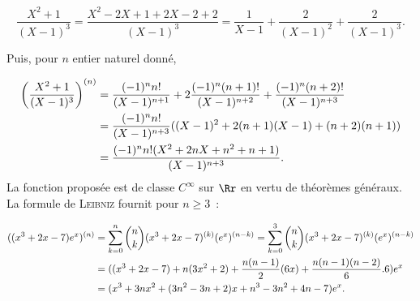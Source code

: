 {{$$\frac{X^2+1}{(X-1)^3}=\frac{X^2-2X+1+2X-2+2}{(X-1)^3}=\frac{1}{X-1}+\frac{2}{(X-1)^2}+\frac{2}{(X-1)^3}.$$

Puis, pour $n$ entier naturel donné,

\begin{align*}\ensuremath
\left(\frac{X^2+1}{(X-1)^3}\right)^{(n)}&=\frac{(-1)^nn!}{(X-1)^{n+1}}+2\frac{(-1)^n(n+1)!}{(X-1)^{n+2}}+\frac{(-1)^n(n+2)!}{(X-1)^{n+3}}\\
 &=\frac{(-1)^nn!}{(X-1)^{n+3}}((X-1)^2+2(n+1)(X-1)+(n+2)(n+1))\\
 &=\frac{(-1)^nn!(X^2+2nX+n^2+n+1)}{(X-1)^{n+3}}.
\end{align*}
La fonction proposée est de classe $C^\infty$ sur $\Rr$ en vertu de théorèmes généraux. La formule de \textsc{Leibniz} fournit pour $n\geq3$~:

\begin{align*}\ensuremath
((x^3+2x-7)e^x)^{(n)}&=\sum_{k=0}^{n}\dbinom{n}{k}(x^3+2x-7)^{(k)}(e^x)^{(n-k)}=\sum_{k=0}^{3}\dbinom{n}{k}(x^3+2x-7)^{(k)}(e^x)^{(n-k)}\\
 &=((x^3+2x-7)+n(3x^2+2)+\frac{n(n-1)}{2}(6x)+\frac{n(n-1)(n-2)}{6}.6)e^x\\
 &=(x^3+3nx^2+(3n^2-3n+2)x+n^3-3n^2+4n-7)e^x.
\end{align*}
}
}

